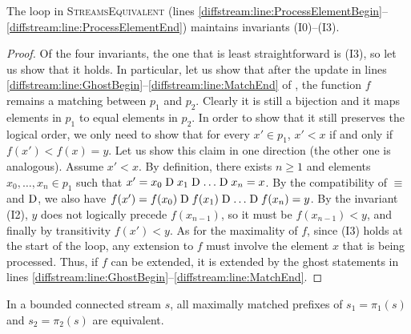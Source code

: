 \begin{lemma}
  The loop in \textsc{StreamsEquivalent} (lines \ref{diffstream:line:ProcessElementBegin}--\ref{diffstream:line:ProcessElementEnd}) maintains invariants (I0)--(I3).
\end{lemma}

\begin{proof}
  Of the four invariants,
  the one that is least straightforward is (I3), so let us show that it
  holds. In particular, let us show that after the update in lines
  \ref{diffstream:line:GhostBegin}--\ref{diffstream:line:MatchEnd} of , the function $f$
  remains a matching between $p_1$ and $p_2$. Clearly it is still a
  bijection and it maps elements in $p_1$ to equal elements in $p_2$. In
  order to show that it still preserves the logical order, we only need
  to show that for every $x'\in p_1$, $x'<x$ if and only if
  $f(x')<f(x)=y$. Let us show this claim in one direction (the other one
  is analogous).  Assume $x'<x$. By definition, there exists $n\geq 1$
  and elements $x_0, \ldots, x_n\in p_1$ such that $x'=x_0 \mathrel{\mathrm{D}} x_1 \mathrel{\mathrm{D}}
  \ldots \mathrel{\mathrm{D}} x_n=x$.  By the compatibility of $\equiv$ and $\mathrel{\mathrm{D}}$, we
  also have $f(x')=f(x_0) \mathrel{\mathrm{D}} f(x_1) \mathrel{\mathrm{D}} \ldots \mathrel{\mathrm{D}} f(x_n)=y$. By the
  invariant (I2), $y$ does not logically precede $f(x_{n-1})$, so it
  must be $f(x_{n-1})<y$, and finally by transitivity $f(x')<y$. As for
  the maximality of $f$, since (I3) holds at the start of the loop, any extension to $f$ must involve the element $x$ that is
  being processed. Thus, if $f$ can be extended, it is extended by the
  ghost statements in lines \ref{diffstream:line:GhostBegin}--\ref{diffstream:line:MatchEnd}.
\end{proof}

\begin{lemma}\label{diffstream:lem:maximal-prefixes}
  In a bounded connected stream $s$, all maximally matched prefixes
  of $s_1=\pi_1(s)$ and $s_2=\pi_2(s)$ are equivalent.
\end{lemma}

